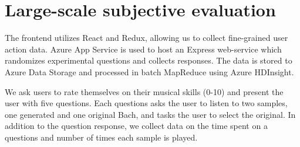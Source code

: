 \chapter{Large-scale subjective evaluation}

The frontend utilizes React and Redux, allowing us to collect fine-grained user
action data. Azure App Service is used to host an Express web-service which
randomizes experimental questions and collects responses. The data is stored to
Azure Data Storage and processed in batch MapReduce using Azure HDInsight.

We ask users to rate themselves on their musical skills (0-10) and present the
user with five questions. Each questions asks the user to listen to two
samples, one generated and one original Bach, and tasks the user to select the
original. In addition to the question response, we collect data on the time
spent on a questions and number of times each sample is played.


